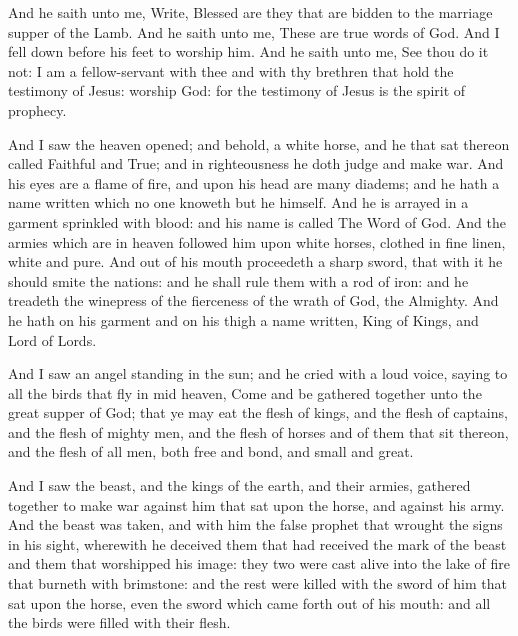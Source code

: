  And he saith unto me, Write, Blessed are they that are bidden to the marriage supper of the Lamb. And he saith unto me, These are true words of God. 
 And I fell down before his feet to worship him. And he saith unto me, See thou do it not: I am a fellow-servant with thee and with thy brethren that hold the testimony of Jesus: worship God: for the testimony of Jesus is the spirit of prophecy.

 And I saw the heaven opened; and behold, a white horse, and he that sat thereon called Faithful and True; and in righteousness he doth judge and make war. 
 And his eyes are a flame of fire, and upon his head are many diadems; and he hath a name written which no one knoweth but he himself. 
 And he is arrayed in a garment sprinkled with blood: and his name is called The Word of God. 
 And the armies which are in heaven followed him upon white horses, clothed in fine linen, white and pure. 
 And out of his mouth proceedeth a sharp sword, that with it he should smite the nations: and he shall rule them with a rod of iron: and he treadeth the winepress of the fierceness of the wrath of God, the Almighty. 
 And he hath on his garment and on his thigh a name written, King of Kings, and Lord of Lords.

 And I saw an angel standing in the sun; and he cried with a loud voice, saying to all the birds that fly in mid heaven, Come and be gathered together unto the great supper of God; 
 that ye may eat the flesh of kings, and the flesh of captains, and the flesh of mighty men, and the flesh of horses and of them that sit thereon, and the flesh of all men, both free and bond, and small and great.

 And I saw the beast, and the kings of the earth, and their armies, gathered together to make war against him that sat upon the horse, and against his army. 
 And the beast was taken, and with him the false prophet that wrought the signs in his sight, wherewith he deceived them that had received the mark of the beast and them that worshipped his image: they two were cast alive into the lake of fire that burneth with brimstone: 
 and the rest were killed with the sword of him that sat upon the horse, even the sword which came forth out of his mouth: and all the birds were filled with their flesh.
